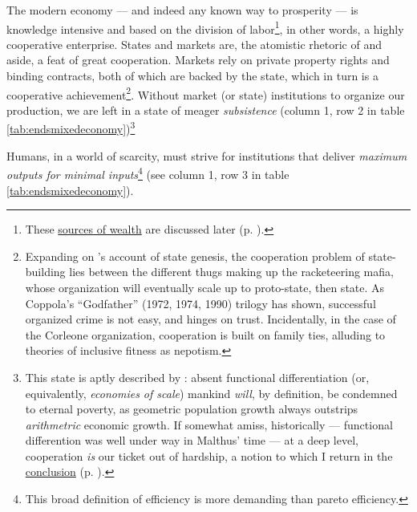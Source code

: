 The modern economy --- and indeed any known way to prosperity --- is knowledge intensive and based on the division of labor\footnote
	{These \hyperref[sec:sourcesofwealth]{sources of wealth} are discussed later (p. \pageref{sec:sourcesofwealth}).},
in other words, a highly cooperative enterprise. States and markets are, the atomistic rhetoric of \citeauthor{Hobbes-1651-aa} and \citeauthor{Smith-1776-lq} aside, a feat of great cooperation. Markets rely on private property rights and binding contracts, both of which are backed by the state, which in turn is a cooperative achievement\footnote{
	Expanding on \citeauthor{Tilly-1985-aa}'s account of state genesis, the cooperation problem of state-building lies between the different thugs making up the racketeering mafia, whose organization will eventually scale up to proto-state, then state. As Coppola's ``Godfather'' (1972, 1974, 1990) trilogy has shown, successful organized crime is not easy, and hinges on trust. Incidentally, in the case of the Corleone organization, cooperation is built on family ties, alluding to theories of inclusive fitness as nepotism.}.
Without market (or state) institutions to organize our production, we are left in a state of meager \emph{subsistence} (column 1, row 2 in table \ref{tab:endsmixedeconomy})\footnote
	{This state is aptly described by \cite{Malthus1798}: absent functional differentiation (or, equivalently, \emph{economies of scale}) mankind \emph{will}, by definition, be condemned to eternal poverty, as geometric population growth always outstrips \emph{arithmetric} economic growth. If somewhat amiss, historically --- functional differention was well under way in Malthus' time --- at a deep level, cooperation \emph{is} our ticket out of hardship, a notion to which I return in the \hyperref[sec:growthsolidarity]{conclusion} (p. \pageref{sec:growthsolidarity}).}

Humans, in a world of scarcity, must strive for institutions that deliver \emph{maximum outputs for minimal inputs}\footnote
	{This broad definition of efficiency is more demanding than pareto efficiency.} 
(see column 1, row 3 in table \ref{tab:endsmixedeconomy}).

